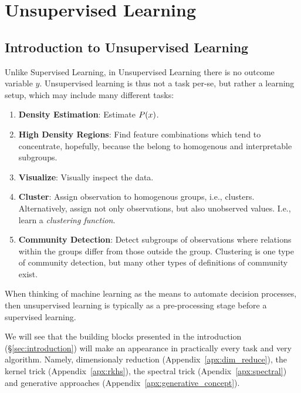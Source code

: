 
\chapter{Unsupervised Learning}

\label{sec:unsupervised}


\section{Introduction to Unsupervised Learning}

Unlike Supervised Learning, in Unsupervised Learning there is no outcome variable $y$.
Unsupervised learning is thus not a task per-se, but rather a learning setup, which may include many different tasks:
\begin{enumerate}
\item \textbf{Density Estimation}: Estimate $P(x)$.

\item \textbf{High Density Regions}: 
Find feature combinations which tend to concentrate, hopefully, because the belong to homogenous and interpretable subgroups.

\item \textbf{Visualize}: 
Visually inspect the data. 

\item \textbf{Cluster}: 
Assign observation to homogenous groups, i.e., clusters.
Alternatively, assign not only observations, but also unobserved values. I.e., learn a \emph{clustering function}.

\item \textbf{Community Detection}: 
Detect subgroups of observations where relations within the groups differ from those outside the group.
Clustering is one type of community detection, but many other types of definitions of community exist.

\end{enumerate}


When thinking of machine learning as the means to automate decision processes, then unsupervised learning is typically as a pre-processing stage before a supervised learning. 

We will see that the building blocks presented in the introduction (\S\ref{sec:introduction}) will make an appearance in practically every task and very algorithm. Namely, dimensionaly reduction (Appendix~\ref{apx:dim_reduce}), the kernel trick (Appendix~\ref{apx:rkhs}), the spectral trick (Apendix~\ref{apx:spectral}) and generative approaches (Appendix~\ref{apx:generative_concept}).







